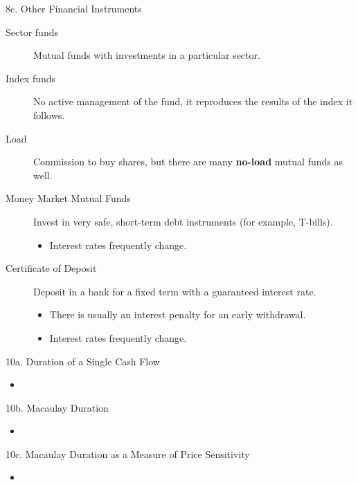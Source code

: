 \begin{CHPT_SUMM_AUTO}[label = {L.-8c}]{8c. Other Financial Instruments}
\begin{description}
	\item[Sector funds]	Mutual funds with investments in a particular sector.
	\item[Index funds]	No active management of the fund, it reproduces the results of the index it follows.
	\item[Load]	Commission to buy shares, but there are many \textbf{no-load} mutual funds as well.
	\item[Money Market Mutual Funds]	Invest in very safe, short-term debt instruments (for example, T-bills).
		\begin{itemize}[leftmargin = *]
		\item	Interest rates frequently change.
		\end{itemize}
	\item[Certificate of Deposit]	Deposit in a bank for a fixed term with a guaranteed interest rate.
		\begin{itemize}[leftmargin = *]
		\item	There is usually an interest penalty for an early withdrawal.
		\item	Interest rates frequently change.
		\end{itemize}
\end{description}
\end{CHPT_SUMM_AUTO}

\begin{CHPT_SUMM_AUTO}[label = {L.-10a}]{10a. Duration of a Single Cash Flow}
	\begin{itemize}
		\item	
	\end{itemize}
\end{CHPT_SUMM_AUTO}

\begin{CHPT_SUMM_AUTO}[label = {L.-10b}]{10b. Macaulay Duration}
	\begin{itemize}
		\item	
	\end{itemize}
\end{CHPT_SUMM_AUTO}

\begin{CHPT_SUMM_AUTO}[label = {L.-10c}]{10c. Macaulay Duration as a Measure of Price Sensitivity}
	\begin{itemize}
		\item	
	\end{itemize}
\end{CHPT_SUMM_AUTO}

